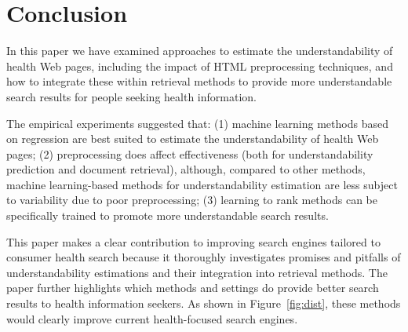 
\section{Conclusion}
\label{sec:conclusion_doc_analysis}

In this paper we have examined approaches to estimate the understandability of health Web pages, including the impact of HTML preprocessing techniques, and how to integrate these within retrieval methods to provide more understandable search results for people seeking health information. 

The empirical experiments suggested that: (1) machine learning methods based on regression are best suited to estimate the understandability of health Web pages; (2) preprocessing does affect effectiveness (both for understandability prediction and document retrieval), although, compared to other methods, machine learning-based methods for understandability estimation are less subject to variability due to poor preprocessing; (3) learning to rank methods can be specifically trained to promote more understandable search results. 

This paper makes a clear contribution to improving search engines tailored to consumer health search because it thoroughly investigates promises and pitfalls of understandability estimations and their integration into retrieval methods. The paper further highlights which methods and settings do provide better search results to health information seekers. As shown in Figure~\ref{fig:dist}, these methods would clearly improve current health-focused search engines. 


%
%
%


